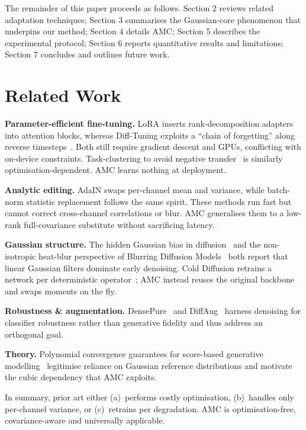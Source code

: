 \documentclass{article} %
\begin{document}
The remainder of this paper proceeds as follows. Section 2 reviews related adaptation techniques; Section 3 summarises the Gaussian-core phenomenon that underpins our method; Section 4 details AMC; Section 5 describes the experimental protocol; Section 6 reports quantitative results and limitations; Section 7 concludes and outlines future work.

\section{Related Work}
\label{sec:related}
\textbf{Parameter-efficient fine-tuning.} LoRA inserts rank-decomposition adapters into attention blocks, whereas Diff-Tuning exploits a ``chain of forgetting'' along reverse timesteps~\cite{zhong_2024_diffusion}. Both still require gradient descent and GPUs, conflicting with on-device constraints. Task-clustering to avoid negative transfer~\cite{go_2023_addressing} is similarly optimisation-dependent. AMC learns nothing at deployment.

\textbf{Analytic editing.} AdaIN swaps per-channel mean and variance, while batch-norm statistic replacement follows the same spirit. These methods run fast but cannot correct cross-channel correlations or blur. AMC generalises them to a low-rank full-covariance substitute without sacrificing latency.

\textbf{Gaussian structure.} The hidden Gaussian bias in diffusion~\cite{li_2024_understanding} and the non-isotropic heat-blur perspective of Blurring Diffusion Models~\cite{hoogeboom_2022_blurring} both report that linear Gaussian filters dominate early denoising. Cold Diffusion retrains a network per deterministic operator~\cite{bansal_2022_cold}; AMC instead reuses the original backbone and swaps moments on the fly.

\textbf{Robustness \& augmentation.} DensePure~\cite{xiao_2022_densepure} and DiffAug~\cite{sastry_2023_diffaug} harness denoising for classifier robustness rather than generative fidelity and thus address an orthogonal goal.

\textbf{Theory.} Polynomial convergence guarantees for score-based generative modelling~\cite{lee_2022_convergence} legitimise reliance on Gaussian reference distributions and motivate the cubic dependency that AMC exploits.

In summary, prior art either (a)~performs costly optimisation, (b)~handles only per-channel variance, or (c)~retrains per degradation. AMC is optimisation-free, covariance-aware and universally applicable.
\end{document}

